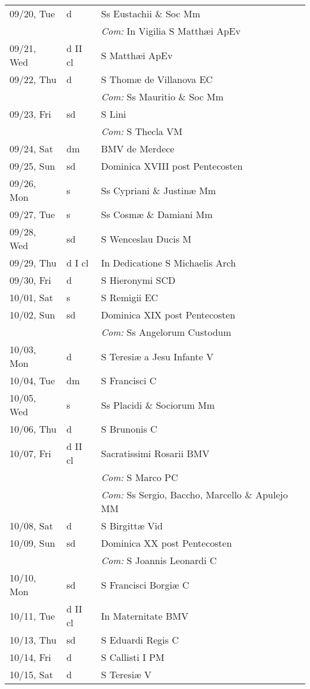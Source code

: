 \documentclass[10pt]{article}
\begin{document}
\begin{longtable}{ l l l }
09/20, Tue & d & Ss Eustachii \& Soc Mm\\
 & & \textit{Com:} In Vigilia S Matthæi ApEv\\
09/21, Wed & d II cl & S Matthæi ApEv\\
09/22, Thu & d & S Thomæ de Villanova EC\\
 & & \textit{Com:} Ss Mauritio \& Soc Mm\\
09/23, Fri & sd & S Lini\\
 & & \textit{Com:} S Thecla VM\\
09/24, Sat & dm & BMV de Merdece\\
09/25, Sun & sd & Dominica XVIII post Pentecosten\\
09/26, Mon & s & Ss Cypriani \& Justinæ Mm\\
09/27, Tue & s & Ss Cosmæ \& Damiani Mm\\
09/28, Wed & sd & S Wenceslau Ducis M\\
09/29, Thu & d I cl & In Dedicatione S Michaelis Arch\\
09/30, Fri & d & S Hieronymi SCD\\
10/01, Sat & s & S Remigii EC\\
10/02, Sun & sd & Dominica XIX post Pentecosten\\
 & & \textit{Com:} Ss Angelorum Custodum\\
10/03, Mon & d & S Teresiæ a Jesu Infante V\\
10/04, Tue & dm & S Francisci C\\
10/05, Wed & s & Ss Placidi \& Sociorum Mm\\
10/06, Thu & d & S Brunonis C\\
10/07, Fri & d II cl & Sacratissimi Rosarii BMV\\
 & & \textit{Com:} S Marco PC\\
 & & \textit{Com:} Ss Sergio, Baccho, Marcello \& Apulejo MM\\
10/08, Sat & d & S Birgittæ Vid\\
10/09, Sun & sd & Dominica XX post Pentecosten\\
 & & \textit{Com:} S Joannis Leonardi C\\
10/10, Mon & sd & S Francisci Borgiæ C\\
10/11, Tue & d II cl & In Maternitate BMV\\
10/13, Thu & sd & S Eduardi Regis C\\
10/14, Fri & d & S Callisti I PM\\
10/15, Sat & d & S Teresiæ V\\

\end{longtable}
\end{document}
